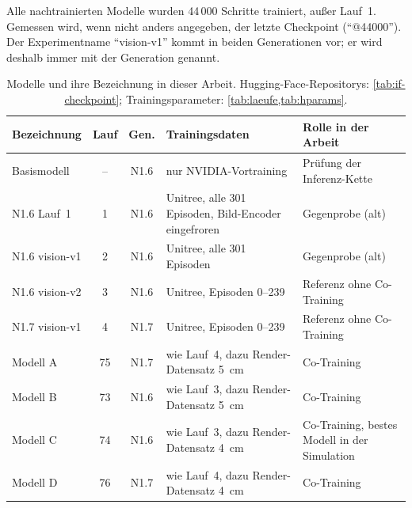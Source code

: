 Alle nachtrainierten Modelle wurden 44\,000 Schritte trainiert, außer Lauf~1. Gemessen wird,
wenn nicht anders angegeben, der letzte Checkpoint (\enquote{@44000}). Der Experimentname
\enquote{vision-v1} kommt in beiden Generationen vor; er wird deshalb immer mit der Generation
genannt.

\begin{table}[htb]
  \centering
  \small
  \begin{tabularx}{\linewidth}{>{\raggedright\arraybackslash}p{2.9cm}cc>{\raggedright\arraybackslash}X>{\raggedright\arraybackslash}p{3.2cm}}
    \toprule
    Bezeichnung & Lauf & Gen. & Trainingsdaten & Rolle in der Arbeit \\
    \midrule
    Basismodell & -- & N1.6 & nur NVIDIA-Vortraining & Prüfung der Inferenz-Kette \\
    N1.6 Lauf~1 & 1 & N1.6 & Unitree, alle 301 Episoden, Bild-Encoder eingefroren &
      Gegenprobe (alt) \\
    N1.6 vision-v1 & 2 & N1.6 & Unitree, alle 301 Episoden & Gegenprobe (alt) \\
    N1.6 vision-v2 & 3 & N1.6 & Unitree, Episoden 0--239 & Referenz ohne Co-Training \\
    N1.7 vision-v1 & 4 & N1.7 & Unitree, Episoden 0--239 & Referenz ohne Co-Training \\
    \addlinespace
    Modell A & 75 & N1.7 & wie Lauf~4, dazu Render-Datensatz 5~cm & Co-Training \\
    Modell B & 73 & N1.6 & wie Lauf~3, dazu Render-Datensatz 5~cm & Co-Training \\
    Modell C & 74 & N1.6 & wie Lauf~3, dazu Render-Datensatz 4~cm & Co-Training,
      bestes Modell in der Simulation \\
    Modell D & 76 & N1.7 & wie Lauf~4, dazu Render-Datensatz 4~cm & Co-Training \\
    \bottomrule
  \end{tabularx}
  \caption[Modelle]{Modelle und ihre Bezeichnung in dieser Arbeit. Hugging-Face-Repositorys:
    \cref{tab:if-checkpoint}; Trainingsparameter: \cref{tab:laeufe,tab:hparams}.}
  \label{tab:modelle}
\end{table}

